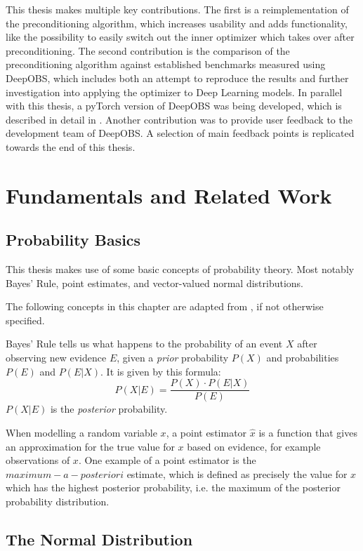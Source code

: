\documentclass[twoside,12pt,a4paper]{report}
\begin{document}
This thesis makes multiple key contributions. The first is a reimplementation of the preconditioning algorithm, which increases usability and adds functionality, like the possibility to easily switch out the inner optimizer which takes over after preconditioning.
The second contribution is the comparison of the preconditioning algorithm against established benchmarks measured using DeepOBS, which includes both an attempt to reproduce the results and further investigation into applying the optimizer to Deep Learning models.
In parallel with this thesis, a pyTorch version of DeepOBS was being developed, which is described in detail in \cite{abahde}. Another contribution was to provide user feedback to the development team of DeepOBS. A selection of main feedback points is replicated towards the end of this thesis.


\chapter{Fundamentals and Related Work}
\section{Probability Basics}
This thesis makes use of some basic concepts of probability theory. Most notably Bayes' Rule, point estimates, and vector-valued normal distributions.

The following concepts in this chapter are adapted from \cite{bishop2006pattern}, if not otherwise specified.

Bayes' Rule tells us what happens to the probability of an event $X$ after observing new evidence $E$, given a \textit{prior} probability $P(X)$ and probabilities $P(E)$ and $P(E|X)$. It is given by this formula:
$$P(X|E) = \frac{P(X) \cdot P(E|X)}{P(E)}$$
$P(X|E)$ is the \textit{posterior} probability.

When modelling a random variable $x$, a point estimator $\hat{x}$ is a function that gives an approximation for the true value for $x$ based on evidence, for example observations of $x$. One example of a point estimator is the $maximum-a-posteriori$ estimate, which is defined as precisely the value for $x$ which has the highest posterior probability, i.e. the maximum of the posterior probability distribution.

\section{The Normal Distribution}
\end{document}
